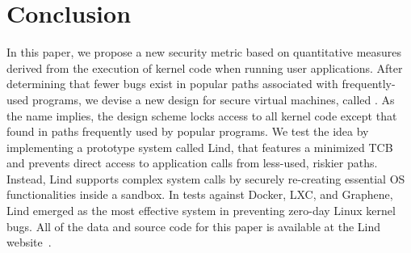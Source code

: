 \section{Conclusion}
\label{sec.conclusion}

In this paper, we propose a new security metric based on quantitative measures derived from
the execution of kernel code when running user applications.
After determining that fewer bugs exist in popular paths associated with frequently-used
programs, we devise a new design for secure virtual machines, called \lip.
As the name implies, the design scheme locks access to all
kernel code except that found in paths frequently used by
popular programs. We test the \lip idea by implementing a prototype system
called Lind, that features a minimized TCB and prevents direct access to application
calls from less-used, riskier paths.
Instead, Lind supports complex system calls by securely re-creating
essential OS functionalities inside a sandbox.
In tests against Docker, LXC, and Graphene, Lind emerged as the most effective system in preventing
zero-day Linux kernel bugs.
All of the data and source code for this paper is available at the Lind website~\cite{Lind}.
